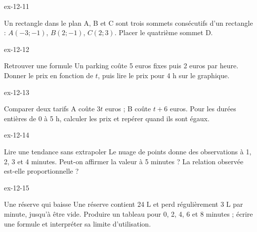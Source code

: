 \begin{blocLivre}{ex-12-11}\begin{exercice}[3]{Un rectangle dans le plan}
A, B et C sont trois sommets consécutifs d’un rectangle : $A(-3;-1)$, $B(2;-1)$, $C(2;3)$. Placer le quatrième sommet D.
\label{fig-ex-12-11}
\end{exercice}\end{blocLivre}
\begin{blocLivre}{ex-12-12}\begin{exercice}[3]{Retrouver une formule}
Un parking coûte 5 euros fixes puis 2 euros par heure. Donner le prix en fonction de $t$, puis lire le prix pour 4 h sur le graphique.
\label{fig-ex-12-12}
\end{exercice}\end{blocLivre}
\begin{blocLivre}{ex-12-13}\begin{exercice}[3]{Comparer deux tarifs}
A coûte $3t$ euros ; B coûte $t+6$ euros. Pour les durées entières de 0 à 5 h, calculer les prix et repérer quand ils sont égaux.
\label{fig-ex-12-13}
\end{exercice}\end{blocLivre}
\begin{blocLivre}{ex-12-14}\begin{exercice}[3]{Lire une tendance sans extrapoler}
Le nuage de points donne des observations à 1, 2, 3 et 4 minutes. Peut-on affirmer la valeur à 5 minutes ? La relation observée est-elle proportionnelle ?
\label{fig-ex-12-14}
\end{exercice}\end{blocLivre}
\begin{blocLivre}{ex-12-15}\begin{exercice}[3]{Une réserve qui baisse}
Une réserve contient 24 L et perd régulièrement 3 L par minute, jusqu’à être vide. Produire un tableau pour 0, 2, 4, 6 et 8 minutes ; écrire une formule et interpréter sa limite d’utilisation.
\label{fig-ex-12-15}
\end{exercice}\end{blocLivre}

\clearpage
